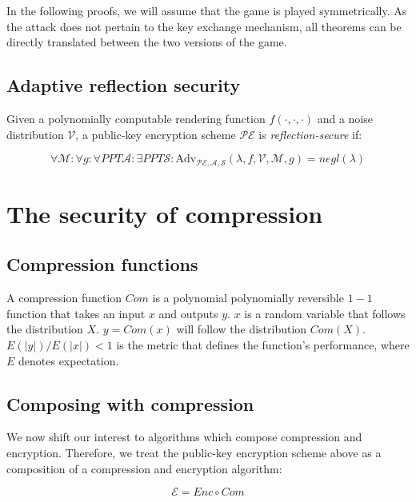\documentclass[a4paper, 11 pt, conference]{article}
\begin{document}
In the following proofs, we will assume that the game is played symmetrically.
As the attack does not pertain to the key exchange mechanism, all theorems can
be directly translated between the two versions of the game.

\subsection{Adaptive reflection security}\label{subsec:adaptiverefsec}

Given a polynomially computable rendering function $f(\cdot, \cdot, \cdot)$ and
a  noise distribution $\mathcal{V}$, a public-key encryption scheme
$\mathcal{PE}$ is \textit{reflection-secure} if:

\begin{equation*}
\forall \mathcal{M}:
\forall g:
\forall PPT \mathcal{A}:
\exists PPT \mathcal{S}:
\text{Adv}_{\mathcal{PE}, \mathcal{A}, \mathcal{S}}(\lambda, f, \mathcal{V}, \mathcal{M}, g) = negl(\lambda)
\end{equation*}

\section{The security of compression}\label{sec:comsec}

\subsection{Compression functions}\label{subsec:comfunc}

A compression function $Com$ is a polynomial polynomially reversible $1 - 1$
function that takes an input $x$ and outputs $y$. $x$ is a random variable that
follows the distribution $X$. $y = Com(x)$ will follow the
distribution $Com(X)$.  $E(|y|) / E(|x|) < 1$ is the metric that defines the
function's performance, where $E$ denotes expectation.

\subsection{Composing with compression}\label{subsec:comcompose}

We now shift our interest to algorithms which compose compression and
encryption.  Therefore, we treat the public-key encryption scheme above as a
composition of a compression and encryption algorithm:

\begin{equation*}
    \mathcal{E} = Enc \circ Com
\end{equation*}
\end{document}
